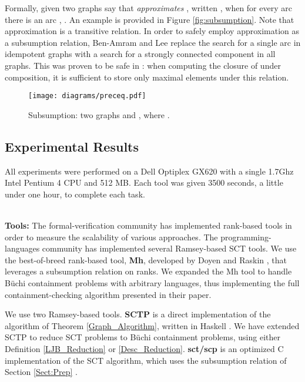 \documentclass{LMCS}
\newcommand{\standout}[1]{\noindent \\ \textbf{#1}}
\newcommand\buchi{B\"uchi }
\begin{document}
Formally, given two graphs  say that 
\emph{approximates} , written , when for every arc
 there is an arc , . An example is
provided in Figure \ref{fig:subsumption}. Note that approximation is a transitive relation.  In
order to safely employ approximation as a subsumption relation, Ben-Amram and Lee replace the search
for a single arc in idempotent graphs with a search for a strongly connected component in all
graphs. This was proven to be safe in \cite{Fog08}: when computing the closure of
 under composition, it is sufficient to store only maximal elements under this
relation. 

\begin{figure}[tb]
\begin{center}
\texttt{[image: diagrams/preceq.pdf]}
\end{center}
\caption{Subsumption: two graphs  and , where
.}\label{fig:subsumption}
\label{fig:preceq}
\end{figure}

\subsection{Experimental Results}

All experiments were performed on a Dell Optiplex GX620 with a
single 1.7Ghz Intel Pentium 4 CPU and 512 MB. Each tool was given 3500
seconds, a little under one hour, to complete each task.

\standout{Tools:} The formal-verification community has implemented rank-based
tools in order to measure the scalability of various approaches.  The
programming-languages community has implemented several Ramsey-based SCT 
tools. We use the best-of-breed rank-based tool, \textbf{Mh},
developed by Doyen and Raskin \cite{DR07}, that leverages a subsumption relation
on ranks.  We expanded the Mh tool to handle \buchi containment problems with
arbitrary languages, thus implementing the full containment-checking algorithm
presented in their paper. 

We use two Ramsey-based tools. \textbf{SCTP} is a direct implementation of the
\LJB algorithm of Theorem \ref{Graph_Algorithm}, written in Haskell
\cite{Fred01}.  We have extended SCTP to reduce SCT problems to \buchi
containment problems, using either Definition \ref{LJB_Reduction} or
\ref{Desc_Reduction}. \textbf{sct/scp} is an optimized C implementation of the
SCT algorithm, which uses the subsumption relation of Section \ref{Sect:Prep}
\cite{BL07}. 
\end{document}
